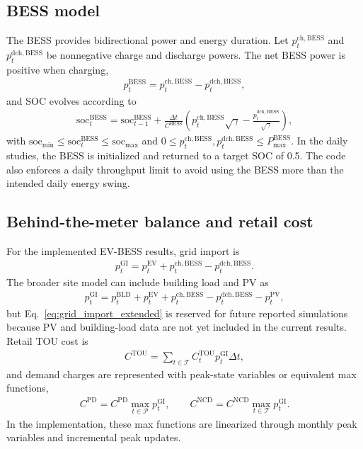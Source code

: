 \documentclass[final,5p,times]{elsarticle}
\newcommand{\DeltaT}{\Delta t}
\newcommand{\EV}{\mathrm{EV}}
\newcommand{\BESS}{\mathrm{BESS}}
\newcommand{\GI}{\mathrm{GI}}
\newcommand{\PV}{\mathrm{PV}}
\newcommand{\BLD}{\mathrm{BLD}}
\newcommand{\TOU}{\mathrm{TOU}}
\newcommand{\PD}{\mathrm{PD}}
\newcommand{\NCD}{\mathrm{NCD}}
\newcommand{\soc}{\mathrm{soc}}
\newcommand{\ch}{\mathrm{ch}}
\newcommand{\dch}{\mathrm{dch}}
\newcommand{\calT}{\mathcal{T}}
\newcommand{\calP}{\mathcal{P}}
\begin{document}
\subsection{BESS model}

The BESS provides bidirectional power and energy duration. Let $p_t^{\ch,\BESS}$ and $p_t^{\dch,\BESS}$ be nonnegative charge and discharge powers. The net BESS power is positive when charging,
\begin{align}
p_t^{\BESS}=p_t^{\ch,\BESS}-p_t^{\dch,\BESS},
\label{eq:bess_net_main}
\end{align}
and SOC evolves according to
\begin{align}
\soc_t^{\BESS}=\soc_{t-1}^{\BESS}
+\frac{\DeltaT}{C^{\BESS}}\left(p_t^{\ch,\BESS}\sqrt{\gamma}
-\frac{p_t^{\dch,\BESS}}{\sqrt{\gamma}}\right),
\label{eq:bess_soc_main}
\end{align}
with $\soc_{\min}\le\soc_t^{\BESS}\le\soc_{\max}$ and $0\le p_t^{\ch,\BESS},p_t^{\dch,\BESS}\le P_{\max}^{\BESS}$. In the daily studies, the BESS is initialized and returned to a target SOC of 0.5. The code also enforces a daily throughput limit to avoid using the BESS more than the intended daily energy swing.

\subsection{Behind-the-meter balance and retail cost}

For the implemented EV-BESS results, grid import is
\begin{align}
p_t^{\GI}=p_t^{\EV}+p_t^{\ch,\BESS}-p_t^{\dch,\BESS}.
\label{eq:grid_import_current}
\end{align}
The broader site model can include building load and PV as
\begin{align}
p_t^{\GI}=p_t^{\BLD}+p_t^{\EV}+p_t^{\ch,\BESS}-p_t^{\dch,\BESS}-p_t^{\PV},
\label{eq:grid_import_extended}
\end{align}
but Eq.~\eqref{eq:grid_import_extended} is reserved for future reported simulations because PV and building-load data are not yet included in the current results. Retail TOU cost is
\begin{align}
C^{\TOU}=\sum_{t\in\calT} C_t^{\TOU}p_t^{\GI}\DeltaT,
\label{eq:tou_cost_main}
\end{align}
and demand charges are represented with peak-state variables or equivalent max functions,
\begin{align}
C^{\PD}=C^{\PD}\max_{t\in\calP}p_t^{\GI},\qquad
C^{\NCD}=C^{\NCD}\max_{t\in\calT}p_t^{\GI}.
\label{eq:demand_cost_main}
\end{align}
In the implementation, these max functions are linearized through monthly peak variables and incremental peak updates.
\end{document}
